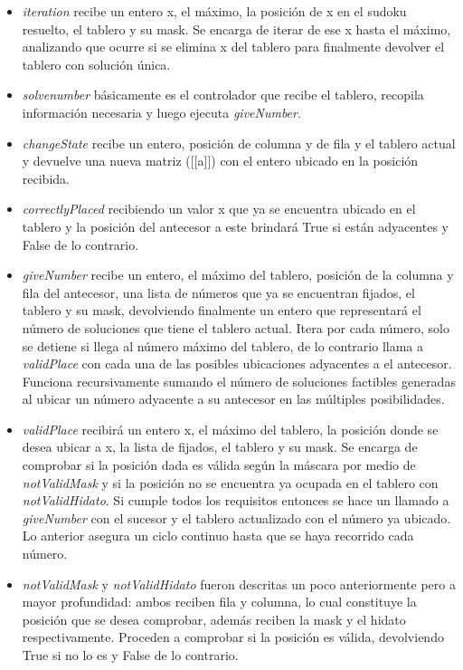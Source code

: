 \documentclass[10pt]{amsart}
\begin{document}
    \begin{itemize}
        \item \textit{iteration} recibe un entero x, el m\'aximo, la posici\'on de x en el sudoku resuelto, el tablero y su mask. Se encarga de iterar de ese x hasta el m\'aximo, analizando que ocurre si se elimina x del tablero para finalmente devolver el tablero con soluci\'on \'unica.
        \item \textit{solvenumber} b\'asicamente es el controlador que recibe el tablero, recopila informaci\'on necesaria y luego ejecuta \textit{giveNumber}.
        \item \textit{changeState} recibe un entero, posici\'on de columna y de fila y el tablero actual y devuelve una nueva matriz ([[a]]) con el entero ubicado en la posici\'on recibida.
        \item \textit{correctlyPlaced} recibiendo un valor x que ya se encuentra ubicado en el tablero y la posici\'on del antecesor a este brindar\'a True si est\'an adyacentes y False de lo contrario.
        \item \textit{giveNumber}  recibe un entero, el m\'aximo del tablero, posici\'on de la columna y fila del antecesor, una lista de números que ya se encuentran fijados, el tablero y su mask, devolviendo finalmente un entero que representar\'a el n\'umero de soluciones que tiene el tablero actual. Itera por cada n\'umero, solo se detiene si llega al número m\'aximo del tablero, de lo contrario llama a \textit{validPlace} con cada una de las posibles ubicaciones adyacentes a el antecesor. Funciona recursivamente sumando el n\'umero de soluciones factibles generadas al ubicar un n\'umero adyacente a su antecesor en las m\'ultiples posibilidades.
		\item \textit{validPlace} recibir\'a un entero x, el m\'aximo del tablero, la posici\'on donde se desea ubicar a x, la lista de fijados, el tablero y su mask. Se encarga de comprobar si la posici\'on dada es v\'alida seg\'un la m\'ascara por medio de \textit{notValidMask} y si la posici\'on no se encuentra ya ocupada en el tablero con \textit{notValidHidato}. Si cumple todos los requisitos entonces se hace un llamado a \textit{giveNumber} con el sucesor y el tablero actualizado con el n\'umero ya ubicado. Lo anterior asegura un ciclo continuo hasta que se haya recorrido cada n\'umero.
		\item \textit{notValidMask} y \textit{notValidHidato} fueron descritas un poco anteriormente pero a mayor profundidad: ambos reciben fila y columna, lo cual constituye la posici\'on que se desea comprobar, adem\'as reciben la mask y el hidato respectivamente. Proceden a comprobar si la posici\'on es v\'alida, devolviendo True si no lo es y False de lo contrario.
    \end{itemize}
\end{document}
